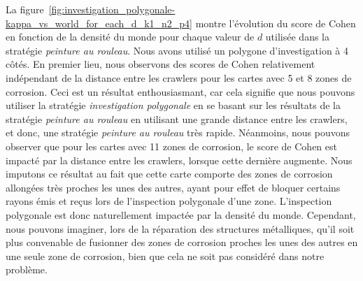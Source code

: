 \documentclass[english,RandD]{rapportPFE}  %
\begin{document}
			La figure~\ref{fig:investigation_polygonale-kappa_vs_world_for_each_d_k1_n2_p4} montre l'évolution du score de Cohen en fonction de la densité du monde pour chaque valeur de $d$ utilisée dans la stratégie \textit{peinture au rouleau}.
			Nous avons utilisé un polygone d'investigation à 4 côtés.
			En premier lieu, nous observons des scores de Cohen relativement indépendant de la distance entre les crawlers pour les cartes avec 5 et 8 zones de corrosion.
			Ceci est un résultat enthousiasmant, car cela signifie que nous pouvons utiliser la stratégie \textit{investigation polygonale} en se basant sur les résultats de la stratégie \textit{peinture au rouleau} en utilisant une grande distance entre les crawlers, et donc, une stratégie \textit{peinture au rouleau} très rapide.
			Néanmoins, nous pouvons observer que pour les cartes avec 11 zones de corrosion, le score de Cohen est impacté par la distance entre les crawlers, lorsque cette dernière augmente.
			Nous imputons ce résultat au fait que cette carte comporte des zones de corrosion allongées très proches les unes des autres, ayant pour effet de bloquer certains rayons émis et reçus lors de l'inspection polygonale d'une zone.
			L'inspection polygonale est donc naturellement impactée par la densité du monde.
			Cependant, nous pouvons imaginer, lors de la réparation des structures métalliques, qu'il soit plus convenable de fusionner des zones de corrosion proches les unes des autres en une seule zone de corrosion, bien que cela ne soit pas considéré dans notre problème.
\end{document}

